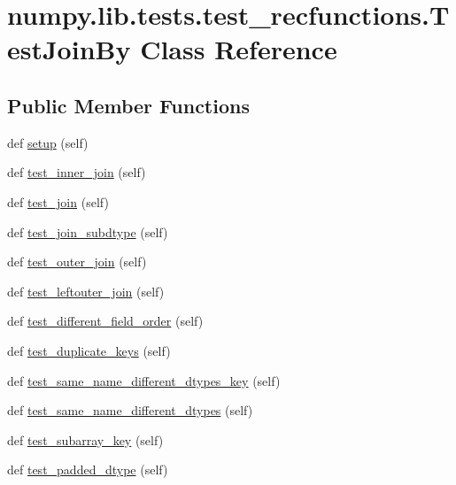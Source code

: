 \hypertarget{classnumpy_1_1lib_1_1tests_1_1test__recfunctions_1_1TestJoinBy}{}\section{numpy.\+lib.\+tests.\+test\+\_\+recfunctions.\+Test\+Join\+By Class Reference}
\label{classnumpy_1_1lib_1_1tests_1_1test__recfunctions_1_1TestJoinBy}
\subsection*{Public Member Functions}
\begin{DoxyCompactItemize}
\item 
def \hyperlink{classnumpy_1_1lib_1_1tests_1_1test__recfunctions_1_1TestJoinBy_ab3e74b8516a4ac8814107e06f0cf32f8}{setup} (self)
\item 
def \hyperlink{classnumpy_1_1lib_1_1tests_1_1test__recfunctions_1_1TestJoinBy_a6dce357ae393aca7f607aa7ef60f957e}{test\+\_\+inner\+\_\+join} (self)
\item 
def \hyperlink{classnumpy_1_1lib_1_1tests_1_1test__recfunctions_1_1TestJoinBy_a86e8fab544d1bad9618274ee4639cc0f}{test\+\_\+join} (self)
\item 
def \hyperlink{classnumpy_1_1lib_1_1tests_1_1test__recfunctions_1_1TestJoinBy_abb350448b4368dc5012f3e3e43a23d1e}{test\+\_\+join\+\_\+subdtype} (self)
\item 
def \hyperlink{classnumpy_1_1lib_1_1tests_1_1test__recfunctions_1_1TestJoinBy_a99e00e019b193b8d60bbcc14f7c10180}{test\+\_\+outer\+\_\+join} (self)
\item 
def \hyperlink{classnumpy_1_1lib_1_1tests_1_1test__recfunctions_1_1TestJoinBy_ae88b90cdf0c60f9f75fe7bbe33b8c8a8}{test\+\_\+leftouter\+\_\+join} (self)
\item 
def \hyperlink{classnumpy_1_1lib_1_1tests_1_1test__recfunctions_1_1TestJoinBy_a83da4d727e407f664211cfd8d541028f}{test\+\_\+different\+\_\+field\+\_\+order} (self)
\item 
def \hyperlink{classnumpy_1_1lib_1_1tests_1_1test__recfunctions_1_1TestJoinBy_a3fb3541c4715e1d4e97a3d1a423d453d}{test\+\_\+duplicate\+\_\+keys} (self)
\item 
def \hyperlink{classnumpy_1_1lib_1_1tests_1_1test__recfunctions_1_1TestJoinBy_af2a2015e666b3bc17ed59c24434a62bd}{test\+\_\+same\+\_\+name\+\_\+different\+\_\+dtypes\+\_\+key} (self)
\item 
def \hyperlink{classnumpy_1_1lib_1_1tests_1_1test__recfunctions_1_1TestJoinBy_a522abaf64d158c1eebf067bac274fc91}{test\+\_\+same\+\_\+name\+\_\+different\+\_\+dtypes} (self)
\item 
def \hyperlink{classnumpy_1_1lib_1_1tests_1_1test__recfunctions_1_1TestJoinBy_ab8039400d84a2e317cc2fd0d236b552c}{test\+\_\+subarray\+\_\+key} (self)
\item 
def \hyperlink{classnumpy_1_1lib_1_1tests_1_1test__recfunctions_1_1TestJoinBy_a4039dd544e2815c5518d291f1271ae7f}{test\+\_\+padded\+\_\+dtype} (self)
\end{DoxyCompactItemize}
